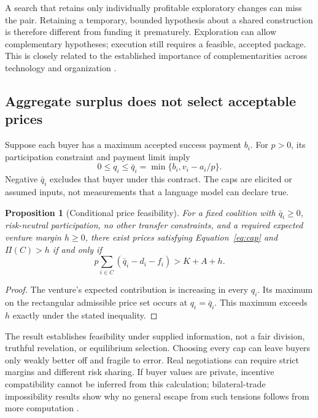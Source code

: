 \documentclass[11pt,letterpaper]{article}
\newtheorem{proposition}{Proposition}[section]
\theoremstyle{remark}\newtheorem{remark}{Remark}[section]
\begin{document}
A search that retains only individually profitable exploratory changes can miss the pair. Retaining a temporary, bounded hypothesis about a shared construction is therefore different from funding it prematurely. Exploration can allow complementary hypotheses; execution still requires a feasible, accepted package. This is closely related to the established importance of complementarities across technology and organization \citep{milgrom1990}.

\subsection{Aggregate surplus does not select acceptable prices}
Suppose each buyer has a maximum accepted success payment $b_i$. For $p>0$, its participation constraint and payment limit imply
\begin{equation}\label{eq:cap}
0\le q_i\le \bar q_i=\min\{b_i,v_i-a_i/p\}.
\end{equation}
Negative $\bar q_i$ excludes that buyer under this contract. The caps are elicited or assumed inputs, not measurements that a language model can declare true.

\begin{proposition}[Conditional price feasibility]\label{prop:price}
For a fixed coalition with $\bar q_i\ge0$, risk-neutral participation, no other transfer constraints, and a required expected venture margin $h\ge0$, there exist prices satisfying Equation~\eqref{eq:cap} and $\Pi(C)>h$ if and only if
\begin{equation}
p\sum_{i\in C}(\bar q_i-d_i-f_i)>K+A+h.
\end{equation}
\end{proposition}
\begin{proof}
The venture's expected contribution is increasing in every $q_i$. Its maximum on the rectangular admissible price set occurs at $q_i=\bar q_i$. This maximum exceeds $h$ exactly under the stated inequality.
\end{proof}
The result establishes feasibility under supplied information, not a fair division, truthful revelation, or equilibrium selection. Choosing every cap can leave buyers only weakly better off and fragile to error. Real negotiations can require strict margins and different risk sharing. If buyer values are private, incentive compatibility cannot be inferred from this calculation; bilateral-trade impossibility results show why no general escape from such tensions follows from more computation \citep{myerson1983}.
\end{document}
